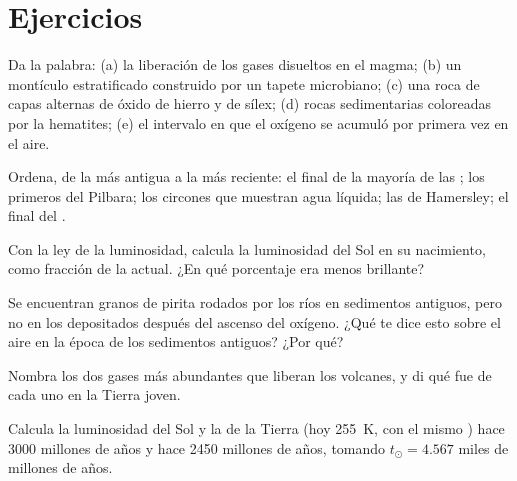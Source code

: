 \section{Ejercicios}

\begin{exercise}[$\star$]\label{exo:g12:early-earth:1}
Da la palabra: (a) la liberación de los gases disueltos en el magma; (b) un
montículo estratificado construido por un tapete microbiano; (c) una roca de
capas alternas de óxido de hierro y de sílex; (d) rocas sedimentarias
coloreadas por la hematites; (e) el intervalo en que el oxígeno se acumuló por
primera vez en el aire.
\end{exercise}

\begin{exercise}[$\star$]\label{exo:g12:early-earth:2}
Ordena, de la más antigua a la más reciente: el final de la mayoría de las
; los primeros  del Pilbara; los
circones que muestran agua líquida; las  de
Hamersley; el final del .
\end{exercise}

\begin{exercise}[$\star$]\label{exo:g12:early-earth:3}
Con la ley de la luminosidad, calcula la luminosidad del Sol en su
nacimiento, como fracción de la actual. ¿En qué porcentaje era menos brillante?
\end{exercise}

\begin{exercise}[$\star$]\label{exo:g12:early-earth:4}
Se encuentran granos de pirita rodados por los ríos en sedimentos antiguos,
pero no en los depositados después del ascenso del oxígeno. ¿Qué te dice esto
sobre el aire en la época de los sedimentos antiguos? ¿Por qué?
\end{exercise}

\begin{exercise}[$\star$]\label{exo:g12:early-earth:5}
Nombra los dos gases más abundantes que liberan los volcanes, y di qué fue de
cada uno en la Tierra joven.
\end{exercise}

\begin{exercise}[$\star\star$]\label{exo:g12:early-earth:6}
Calcula la luminosidad del Sol y la  de la Tierra
(hoy \qty{255}{K}, con el mismo ) hace 3000 millones de años y hace 2450
millones de años, tomando $t_\odot = 4.567$ miles de millones de años.
\end{exercise}


